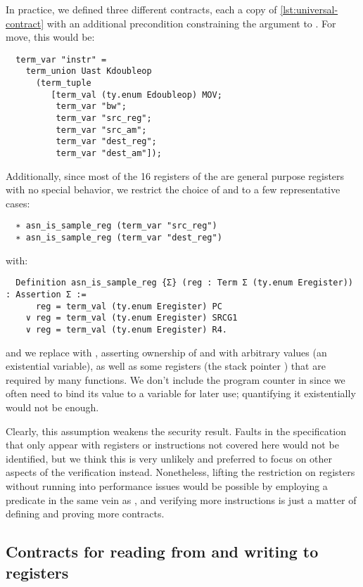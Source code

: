 In practice, we defined three different contracts, each a copy of \cref{lst:universal-contract} with an additional precondition constraining the  argument to . For move, this would be:
\begin{verbatim}
  term_var "instr" =
    term_union Uast Kdoubleop
      (term_tuple
         [term_val (ty.enum Edoubleop) MOV;
          term_var "bw";
          term_var "src_reg";
          term_var "src_am";
          term_var "dest_reg";
          term_var "dest_am"]);
\end{verbatim}

Additionally, since most of the 16 registers of the \msp are general purpose registers with no special behavior, we restrict the choice of  and  to a few representative cases:
\begin{verbatim}
  ∗ asn_is_sample_reg (term_var "src_reg")
  ∗ asn_is_sample_reg (term_var "dest_reg")
\end{verbatim}
with:
\begin{verbatim}
  Definition asn_is_sample_reg {Σ} (reg : Term Σ (ty.enum Eregister)) : Assertion Σ :=
      reg = term_val (ty.enum Eregister) PC
    ∨ reg = term_val (ty.enum Eregister) SRCG1
    ∨ reg = term_val (ty.enum Eregister) R4.
\end{verbatim}
and we replace  with , asserting ownership of  and  with arbitrary values (an existential variable), as well as some registers (\eg the stack pointer ) that are required by many functions. We don't include the program counter in  since we often need to bind its value to a variable for later use; quantifying it existentially would not be enough.

Clearly, this assumption weakens the security result. Faults in the specification that only appear with registers or instructions not covered here would not be identified, but we think this is very unlikely and preferred to focus on other aspects of the verification instead. Nonetheless, lifting the restriction on registers without running into performance issues would be possible by employing a predicate in the same vein as , and verifying more instructions is just a matter of defining and proving more contracts.

\subsection{Contracts for reading from and writing to registers}

